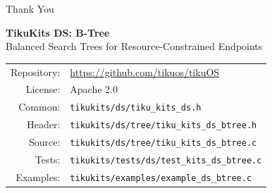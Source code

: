 \documentclass[aspectratio=169, 10pt]{beamer}
\begin{document}
\begin{frame}{Thank You}
\begin{center}
\Large\textbf{TikuKits DS: B-Tree}\\[0.5em]
\normalsize Balanced Search Trees for Resource-Constrained Endpoints\\[1.5em]

\begin{tabular}{rl}
  Repository: & \url{https://github.com/tikuos/tikuOS} \\
  License:    & Apache 2.0 \\
  Common:     & \texttt{tikukits/ds/tiku\_kits\_ds.h} \\
  Header:     & \texttt{tikukits/ds/tree/tiku\_kits\_ds\_btree.h} \\
  Source:     & \texttt{tikukits/ds/tree/tiku\_kits\_ds\_btree.c} \\
  Tests:      & \texttt{tikukits/tests/ds/test\_kits\_ds\_btree.c} \\
  Examples:   & \texttt{tikukits/examples/example\_ds\_btree.c} \\
\end{tabular}
\end{center}
\end{frame}
\end{document}
